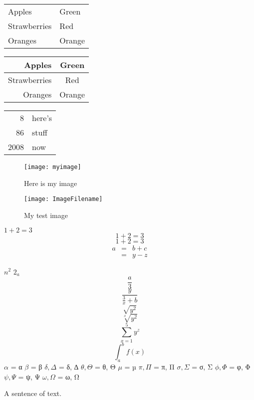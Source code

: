 \documentclass[a4paper,12pt]{article}
\begin{document}
\begin{tabular}{|l|l|}
Apples & Green \\
Strawberries & Red \\
Oranges & Orange \\
\end{tabular}
\begin{tabular}{rc}
Apples & Green \\
\hline
Strawberries & Red \\
\cline{1-1}
Oranges & Orange \\
\end{tabular}
\begin{tabular}{|r|l|}
\hline
8 & here’s \\
\cline{2-2}
86 & stuff \\
\hline \hline
2008 & now \\
\hline
\end{tabular}

\begin{figure}[h]
\centering
\texttt{[image: myimage]}
\caption{Here is my image}
\label{image-myimage}
\end{figure}

\begin{figure}[h!]
\centering
\texttt{[image: ImageFilename]}
\caption{My test image}
\end{figure}

$1+2=3$
$$1+2=3$$
\begin{equation}1+2=3\end{equation}
\begin{eqnarray}
  a & = & b + c \\
    & = & y - z
\end{eqnarray}

$n^2$
$2_a$ 
$$\frac{a}{3}$$
$$\frac{y}{\frac{3}{x}+b}$$
$$\sqrt{y^2}$$
$$\sqrt[x]{y^2}$$
$$\sum_{x=1}^5 y^z$$
$$\int_a^b f(x)$$
$\alpha$ = α
$\beta$ = β
$\delta, \Delta$ = δ, ∆
$\theta, \Theta$ = θ, Θ
$\mu$ = µ
$\pi, \Pi$ = π, Π
$\sigma, \Sigma$ = σ, Σ
$\phi, \Phi$ = φ, Φ
$\psi, \Psi$ = ψ, Ψ
$\omega, \Omega$ = ω, Ω

\begin{comment}
This is a comments.
\end{comment}

A sentence of text.
\end{document}
